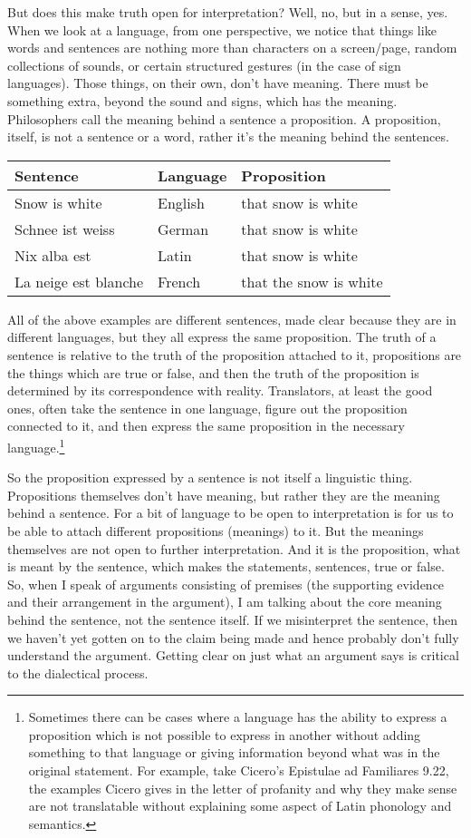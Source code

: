 But does this make truth open for interpretation? Well, no, but in a sense, yes. When we look at a language, from one perspective, we notice that things like words and sentences are nothing more than characters on a screen/page, random collections of sounds, or certain structured gestures (in the case of sign languages). Those things, on their own, don't have meaning. There must be something extra, beyond the sound and signs, which has the meaning.  Philosophers call the meaning behind a sentence a proposition. A proposition, itself, is not a sentence or a word, rather it's the meaning behind the sentences.
\begin{center}
\begin{tabular}{p{2in}|p{1.5in}|p{2in}}\hline
Sentence &Language &Proposition\\\hline
Snow is white &English &that snow is white\\\hline
Schnee ist weiss &German &that snow is white\\\hline
Nix alba est &Latin &that snow is white\\\hline
La neige est blanche &French &that the snow is white\\\hline
\end{tabular}
\end{center}
All of the above examples are different sentences, made clear because they are in different languages, but they all express the same proposition. The truth of a sentence is relative to the truth of the proposition attached to it, propositions are the things which are true or false, and then the truth of the proposition is determined by its correspondence with reality. Translators, at least the good ones, often take the sentence in one language, figure out the proposition connected to it, and then express the same proposition in the necessary language.\footnote{Sometimes there can be cases where a language has the ability to express a proposition which is not possible to express in another without adding something to that language or giving information beyond what was in the original statement. For example, take Cicero's Epistulae ad Familiares 9.22, the examples Cicero gives in the letter of profanity and why they make sense are  not translatable without explaining some aspect of Latin phonology and semantics.}

So the proposition expressed by a sentence is not itself a linguistic thing. Propositions themselves don't have meaning, but rather they are the meaning behind a sentence. For a bit of language to be open to interpretation is for us to be able to attach different propositions (meanings) to it. But the meanings themselves are not open to further interpretation. And it is the proposition, what is meant by the sentence, which makes the statements, sentences, true or false. So, when I speak of arguments consisting of premises (the supporting evidence and their arrangement in the argument), I am talking about the core meaning behind the sentence, not the sentence itself. If we misinterpret the sentence, then we haven’t yet gotten on to the claim being made and hence probably don’t fully understand the argument. Getting clear on just what an argument says is critical to the dialectical process.

